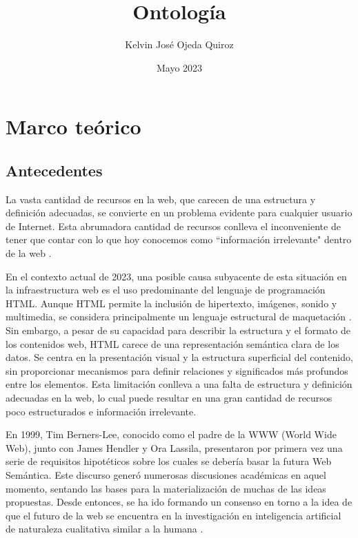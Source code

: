 \documentclass[10pt, a4paper,openany]{book}
\title{Ontología}
\author{Kelvin José Ojeda Quiroz}
\date{Mayo 2023}
\theoremstyle{definition}
\begin{document}
\maketitle

\section{Marco teórico}
\label{S: Marco teórico}
\subsection{Antecedentes}
\label{SS: Antecedentes}
La vasta cantidad de recursos en la web, que carecen de una estructura y definición adecuadas, se convierte en un problema evidente para cualquier usuario de Internet.
Esta abrumadora cantidad de recursos conlleva el inconveniente de tener que contar con lo que hoy conocemos como ``información irrelevante" dentro de la web \cite{bonilla_web_2006}.

En el contexto actual de 2023, una posible causa subyacente de esta situación en la infraestructura web es el uso predominante del lenguaje de programación HTML.
Aunque HTML permite la inclusión de hipertexto, imágenes, sonido y multimedia, se considera principalmente un lenguaje estructural de maquetación \cite{bonilla_web_2006}.
Sin embargo, a pesar de su capacidad para describir la estructura y el formato de los contenidos web, HTML carece de una representación semántica clara de los datos.
Se centra en la presentación visual y la estructura superficial del contenido, sin proporcionar mecanismos para definir relaciones y significados más profundos entre los elementos.
Esta limitación conlleva a una falta de estructura y definición adecuadas en la web, lo cual puede resultar en una gran cantidad de recursos poco estructurados e información irrelevante.

En 1999, Tim Berners-Lee, conocido como el padre de la WWW (World Wide Web), junto con James Hendler y Ora Lassila, presentaron por primera vez una serie de requisitos hipotéticos sobre los cuales se debería basar la futura Web Semántica.
Este discurso generó numerosas discusiones académicas en aquel momento, sentando las bases para la materialización de muchas de las ideas propuestas.
Desde entonces, se ha ido formando un consenso en torno a la idea de que el futuro de la web se encuentra en la investigación en inteligencia artificial de naturaleza cualitativa similar a la humana \cite{noauthor_scientific_nodate}.
\end{document}

